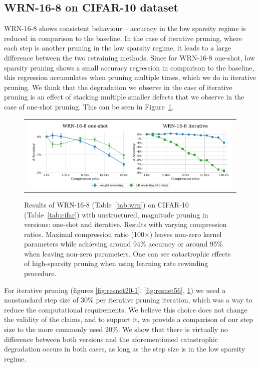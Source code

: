 \subsection{WRN-16-8 on CIFAR-10 dataset}
\nopagebreak

WRN-16-8 shows consistent behaviour -- accuracy in the low sparsity regime is reduced in comparison to the baseline. In the case of iterative pruning, where each step is another pruning in the low sparsity regime, it leads to a large difference between the two retraining methods. Since for WRN-16-8 one-shot, low sparsity pruning shows a small accuracy regression in comparison to the baseline, this regression accumulates when pruning multiple times, which we do in iterative pruning. We think that the degradation we observe in the case of iterative pruning is an effect of stacking multiple smaller defects that we observe in the case of one-shot pruning. This can be seen in Figure~\ref{fig:wrn-1}.

\begin{figure}[H]
\setlength{\tabcolsep}{0pt}
  \begin{center}
    \begin{tabular}{c}
      \includegraphics[width=1.0\linewidth]{pics/WRN-16-8-LR-rewinding-is-flawed2.pdf}\\
    \end{tabular}
  \end{center}
\caption{Results of WRN-16-8 (Table~\ref{tab:wrn}) on CIFAR-10 (Table~\ref{tab:cifar}) with unstructured, magnitude pruning in versions: one-shot and iterative. Results with varying compression ratios. Maximal compression ratio (100$\times$) leaves  non-zero kernel parameters while achieving around 94\% accuracy or around 95\% when leaving  non-zero parameters. One can see catastrophic effects of high-sparsity pruning when using learning rate rewinding procedure.}
\label{fig:wrn-1}
\end{figure}

For iterative pruning (figures \ref{fig:resnet20-1}, \ref{fig:resnet56}, \ref{fig:wrn-1}) we used a nonstandard step size of 30\% per iterative pruning iteration, which was a way to reduce the computational requirements. We believe this choice does not change the validity of the claims, and to support it, we provide a comparison of our step size to the more commonly used 20\%. We show that there is virtually no difference between both versions and the aforementioned catastrophic degradation occurs in both cases, as long as the step size is in the low sparsity regime.

